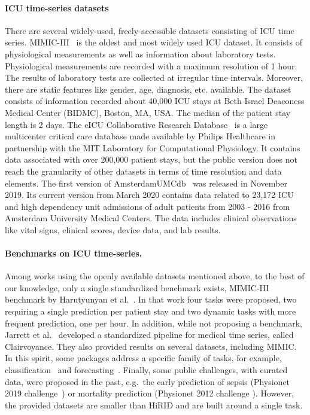 \documentclass{article}
\begin{document}
\paragraph{ICU time-series datasets} 
There are several widely-used, freely-accessible datasets consisting of ICU time series. MIMIC-III~\cite{johnson2016mimic} is the oldest and most widely used ICU dataset. It consists of physiological measurements as well as information about laboratory tests. Physiological measurements are recorded with a maximum resolution of 1 hour. The results of laboratory tests are collected at irregular time intervals. Moreover, there are static features like gender, age, diagnosis, etc. available. The dataset consists of information recorded about 40,000 ICU stays at Beth Israel Deaconess Medical Center (BIDMC), Boston, MA, USA. The median of the patient stay length is 2 days. The eICU Collaborative Research Database~\cite{pollard2018eicu} is a large multicenter critical care database made available by Philips Healthcare in partnership with the MIT Laboratory for Computational Physiology. It contains data associated with over 200,000 patient stays, but the public version does not reach the granularity of other datasets in terms of time resolution and data elements.
The first version of AmsterdamUMCdb~\cite{ams} was released in November 2019. Its current version from March 2020 contains data related to 23,172 ICU and high dependency unit admissions of adult patients from 2003 - 2016 from Amsterdam University Medical Centers. The data includes clinical observations like vital signs, clinical scores, device data, and lab results.
\paragraph{Benchmarks on ICU time-series.} Among works using the openly available datasets mentioned above, to the best of our knowledge, only a single standardized benchmark exists, MIMIC-III benchmark by Harutyunyan et al.~\cite{harutyunyan2019multitask}. In that work four tasks were proposed, two requiring a single prediction per patient stay and two dynamic tasks with more frequent prediction, one per hour. In addition, while not proposing a benchmark, Jarrett et al.~\cite{jarrettclairvoyance} developed a standardized pipeline for medical time series, called Clairvoyance. They also provided results on several datasets, including MIMIC. In this spirit, some packages address a specific family of tasks, for example, classification~\cite{faouzi2020pyts} and forecasting~\cite{guecioueurpysf}. Finally, some public challenges, with curated data, were proposed in the past, e.g.~the early prediction of sepsis (Physionet 2019 challenge~\cite{reyna2019early}) or mortality prediction (Physionet 2012 challenge \cite{citi2012physionet}). However, the provided datasets are smaller than HiRID and are built around a single task.
\end{document}
